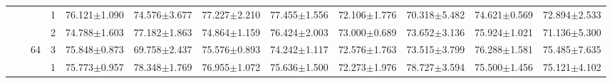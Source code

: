 \begin{table}[htpb]
{\begin{tabular}{c|c|c|c|ll|ll|ll|ll}
                                 &                                                                                 &                                                                                        & 1                                                                                         & 76.121$\pm$1.090                        & 74.576$\pm$3.677                        & 77.227$\pm$2.210                        & 77.455$\pm$1.556                        & 72.106$\pm$1.776                        & 70.318$\pm$5.482                        & 74.621$\pm$0.569                        & 72.894$\pm$2.533                       \\
                                 &                                                                                 &                                                                                        & 2                                                                                         & 74.788$\pm$1.603                        & 77.182$\pm$1.863                        & 74.864$\pm$1.159                        & 76.424$\pm$2.003                        & 73.000$\pm$0.689                        & 73.652$\pm$3.136                        & 75.924$\pm$1.021                        & 71.136$\pm$5.300                       \\
                                 &                                                                                 & \multirow{-3}{*}{64}                                                                   & 3                                                                                         & 75.848$\pm$0.873                        & 69.758$\pm$2.437                        & 75.576$\pm$0.893                        & 74.242$\pm$1.117                        & 72.576$\pm$1.763                        & 73.515$\pm$3.799                        & 76.288$\pm$1.581                        & 75.485$\pm$7.635                       \\ \cline{3-12} 
                                 &                                                                                 &                                                                                        & 1                                                                                         & 75.773$\pm$0.957                        & 78.348$\pm$1.769                        & 76.955$\pm$1.072                        & 75.636$\pm$1.500                        & 72.273$\pm$1.976                        & 78.727$\pm$3.594                        & 75.500$\pm$1.456                        & 75.121$\pm$4.102                       \\

\end{tabular}}
\end{table}
